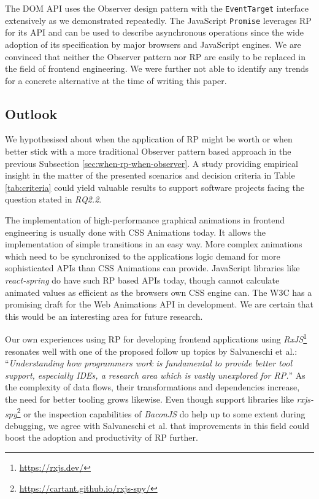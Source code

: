 \documentclass[12pt,a4paper]{article}
\begin{document}
The DOM API uses the Observer design pattern with the \texttt{EventTarget} interface extensively as we demonstrated repeatedly. The JavaScript \texttt{Promise} leverages RP for its API and can be used to describe asynchronous operations since the wide adoption of its specification by major browsers and JavaScript engines. We are convinced that neither the Observer pattern nor RP are easily to be replaced in the field of frontend engineering. We were further not able to identify any trends for a concrete alternative at the time of writing this paper.

\subsection{Outlook}

We hypothesised about when the application of RP might be worth or when better stick with a more traditional Observer pattern based approach in the previous Subsection \ref{sec:when-rp-when-observer}. A study providing empirical insight in the matter of the presented scenarios and decision criteria in Table \ref{tab:criteria} could yield valuable results to support software projects facing the question stated in \emph{RQ2.2}.

The implementation of high-performance graphical animations in frontend engineering is usually done with CSS Animations today. It allows the implementation of simple transitions in an easy way. More complex animations which need to be synchronized to the applications logic demand for more sophisticated APIs than CSS Animations can provide. JavaScript libraries like \emph{react-spring} do have such RP based APIs today, though cannot calculate animated values as efficient as the browsers own CSS engine can. The W3C has a promising draft for the Web Animations API in development. We are certain that this would be an interesting area for future research.

Our own experiences using RP for developing frontend applications using \emph{RxJS}\footnote{\url{https://rxjs.dev/}} resonates well with one of the proposed follow up topics by Salvaneschi et al.: ``\emph{Understanding how programmers work is fundamental to provide better tool support, especially IDEs, a research area which is vastly unexplored for RP.}'' \cite{7827078} As the complexity of data flows, their transformations and dependencies increase, the need for better tooling grows likewise. Even though support libraries like \emph{rxjs-spy}\footnote{\url{https://cartant.github.io/rxjs-spy/}} or the inspection capabilities of \emph{BaconJS} do help up to some extent during debugging, we agree with Salvaneschi et al. that improvements in this field could boost the adoption and productivity of RP further.
\end{document}

